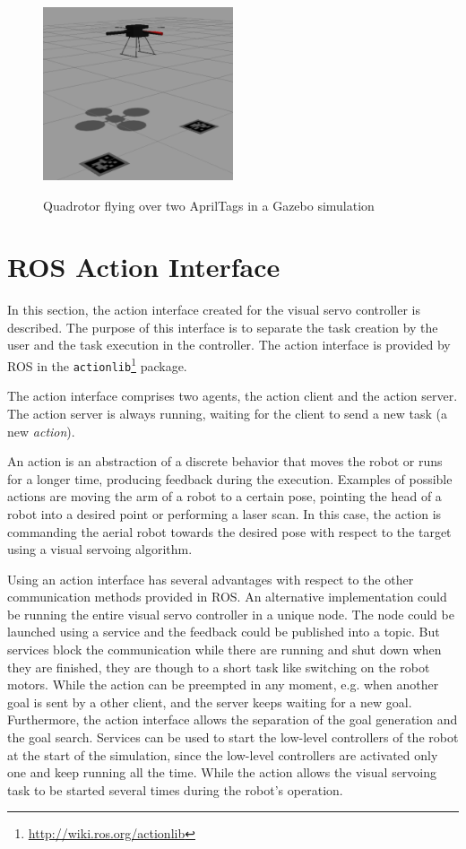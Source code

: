 \begin{figure}[!htb]
	\caption{Quadrotor flying over two AprilTags in a Gazebo simulation}
	\centering
	\includegraphics[width=0.5\textwidth]{content/chapter_05/images/fly2tags.png}
	\label{fig:fly2tags}
\end{figure}

\section{ROS Action Interface}
\label{sec:ros_action}

In this section, the action interface created for the visual servo controller is described. The purpose of this interface is to separate the task creation by the user and the task execution in the controller. The action interface is provided by ROS in the \texttt{actionlib}\footnote{\url{http://wiki.ros.org/actionlib}} package.

The action interface comprises two agents, the action client and the action server. The action server is always running, waiting for the client to send a new task (a new \emph{action}).

An action \cite{ROS_ComPat} is an abstraction of a discrete behavior that moves the robot or runs for a longer time, producing feedback during the execution. Examples of possible actions are moving the arm of a robot to a certain pose, pointing the head of a robot into a desired point or performing a laser scan. In this case, the action is commanding the aerial robot towards the desired pose with respect to the target using a visual servoing algorithm.

Using an action interface has several advantages with respect to the other communication methods provided in ROS. An alternative implementation could be running the entire visual servo controller in a unique node. The node could be launched using a service and the feedback could be published into a topic. But services block the communication while there are running and shut down when they are finished, they are though to a short task like switching on the robot motors. While the action can be preempted in any moment, e.g. when another goal is sent by a other client, and the server keeps waiting for a new goal. Furthermore, the action interface allows the separation of the goal generation and the goal search. Services can be used to start the low-level controllers of the robot at the start of the simulation, since the low-level controllers are activated only one and keep running all the time. While the action allows the visual servoing task to be started several times during the robot's operation.

